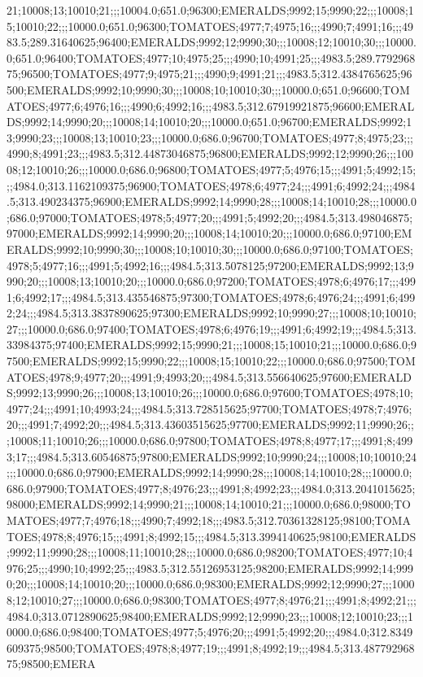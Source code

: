 21;10008;13;10010;21;;;10004.0;651.0;96300;EMERALDS;9992;15;9990;22;;;10008;15;10010;22;;;10000.0;651.0;96300;TOMATOES;4977;7;4975;16;;;4990;7;4991;16;;;4983.5;289.31640625;96400;EMERALDS;9992;12;9990;30;;;10008;12;10010;30;;;10000.0;651.0;96400;TOMATOES;4977;10;4975;25;;;4990;10;4991;25;;;4983.5;289.779296875;96500;TOMATOES;4977;9;4975;21;;;4990;9;4991;21;;;4983.5;312.4384765625;96500;EMERALDS;9992;10;9990;30;;;10008;10;10010;30;;;10000.0;651.0;96600;TOMATOES;4977;6;4976;16;;;4990;6;4992;16;;;4983.5;312.67919921875;96600;EMERALDS;9992;14;9990;20;;;10008;14;10010;20;;;10000.0;651.0;96700;EMERALDS;9992;13;9990;23;;;10008;13;10010;23;;;10000.0;686.0;96700;TOMATOES;4977;8;4975;23;;;4990;8;4991;23;;;4983.5;312.44873046875;96800;EMERALDS;9992;12;9990;26;;;10008;12;10010;26;;;10000.0;686.0;96800;TOMATOES;4977;5;4976;15;;;4991;5;4992;15;;;4984.0;313.1162109375;96900;TOMATOES;4978;6;4977;24;;;4991;6;4992;24;;;4984.5;313.490234375;96900;EMERALDS;9992;14;9990;28;;;10008;14;10010;28;;;10000.0;686.0;97000;TOMATOES;4978;5;4977;20;;;4991;5;4992;20;;;4984.5;313.498046875;97000;EMERALDS;9992;14;9990;20;;;10008;14;10010;20;;;10000.0;686.0;97100;EMERALDS;9992;10;9990;30;;;10008;10;10010;30;;;10000.0;686.0;97100;TOMATOES;4978;5;4977;16;;;4991;5;4992;16;;;4984.5;313.5078125;97200;EMERALDS;9992;13;9990;20;;;10008;13;10010;20;;;10000.0;686.0;97200;TOMATOES;4978;6;4976;17;;;4991;6;4992;17;;;4984.5;313.435546875;97300;TOMATOES;4978;6;4976;24;;;4991;6;4992;24;;;4984.5;313.3837890625;97300;EMERALDS;9992;10;9990;27;;;10008;10;10010;27;;;10000.0;686.0;97400;TOMATOES;4978;6;4976;19;;;4991;6;4992;19;;;4984.5;313.33984375;97400;EMERALDS;9992;15;9990;21;;;10008;15;10010;21;;;10000.0;686.0;97500;EMERALDS;9992;15;9990;22;;;10008;15;10010;22;;;10000.0;686.0;97500;TOMATOES;4978;9;4977;20;;;4991;9;4993;20;;;4984.5;313.556640625;97600;EMERALDS;9992;13;9990;26;;;10008;13;10010;26;;;10000.0;686.0;97600;TOMATOES;4978;10;4977;24;;;4991;10;4993;24;;;4984.5;313.728515625;97700;TOMATOES;4978;7;4976;20;;;4991;7;4992;20;;;4984.5;313.43603515625;97700;EMERALDS;9992;11;9990;26;;;10008;11;10010;26;;;10000.0;686.0;97800;TOMATOES;4978;8;4977;17;;;4991;8;4993;17;;;4984.5;313.60546875;97800;EMERALDS;9992;10;9990;24;;;10008;10;10010;24;;;10000.0;686.0;97900;EMERALDS;9992;14;9990;28;;;10008;14;10010;28;;;10000.0;686.0;97900;TOMATOES;4977;8;4976;23;;;4991;8;4992;23;;;4984.0;313.2041015625;98000;EMERALDS;9992;14;9990;21;;;10008;14;10010;21;;;10000.0;686.0;98000;TOMATOES;4977;7;4976;18;;;4990;7;4992;18;;;4983.5;312.70361328125;98100;TOMATOES;4978;8;4976;15;;;4991;8;4992;15;;;4984.5;313.3994140625;98100;EMERALDS;9992;11;9990;28;;;10008;11;10010;28;;;10000.0;686.0;98200;TOMATOES;4977;10;4976;25;;;4990;10;4992;25;;;4983.5;312.55126953125;98200;EMERALDS;9992;14;9990;20;;;10008;14;10010;20;;;10000.0;686.0;98300;EMERALDS;9992;12;9990;27;;;10008;12;10010;27;;;10000.0;686.0;98300;TOMATOES;4977;8;4976;21;;;4991;8;4992;21;;;4984.0;313.0712890625;98400;EMERALDS;9992;12;9990;23;;;10008;12;10010;23;;;10000.0;686.0;98400;TOMATOES;4977;5;4976;20;;;4991;5;4992;20;;;4984.0;312.8349609375;98500;TOMATOES;4978;8;4977;19;;;4991;8;4992;19;;;4984.5;313.48779296875;98500;EMERA
